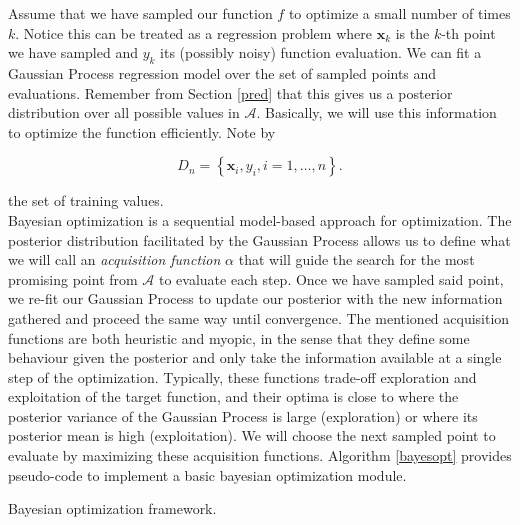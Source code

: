 \documentclass[10pt,a4paper,twoside]{book}
\DeclareMathOperator*{\argmax}{arg\,max}
\begin{document}
Assume that we have sampled our function $f$ to optimize a small number of times $k$. Notice this can be treated as a regression problem where $\boldsymbol{x}_k$ is the $k$-th point we have sampled and $y_k$ its (possibly noisy) function evaluation. We can fit a Gaussian Process regression model over the set of sampled points and evaluations. Remember from Section \ref{pred} that this gives us a posterior distribution over all possible values in $\mathcal{A}$. Basically, we will use this information to optimize the function efficiently. Note by

\begin{equation}
D_n = \left\lbrace \boldsymbol{x}_i, y_i, i=1,\dots,n\right\rbrace.
\end{equation}

the set of training values.\\

Bayesian optimization is a sequential model-based approach for optimization. The posterior distribution facilitated by the Gaussian Process allows us to define what we will call an \textit{acquisition function} $\alpha$ that will guide the search for the most promising point from $\mathcal{A}$ to evaluate each step. Once we have sampled said point, we re-fit our Gaussian Process to update our posterior with the new information gathered and proceed the same way until convergence. The mentioned acquisition functions are both heuristic and myopic, in the sense that they define some behaviour given the posterior and only take the information available at a single step of the optimization. Typically, these functions trade-off exploration and exploitation of the target function, and their optima is close to where the posterior variance of the Gaussian Process is large (exploration) or where its posterior mean is high (exploitation). We will choose the next sampled point to evaluate by maximizing these acquisition functions. Algorithm \ref{bayesopt} provides pseudo-code to implement a basic bayesian optimization module.


\begin{algorithm}
	\caption{Bayesian optimization framework.}
		\label{bayesopt}
		\begin{algorithmic}[1]
				\State{$\boldsymbol{x}_{n+1} \gets \argmax_{\boldsymbol{x}} \alpha(\boldsymbol{x}, \mathcal{D}_n)$}
			\EndFor
		\end{algorithmic}
\end{algorithm}
\end{document}
